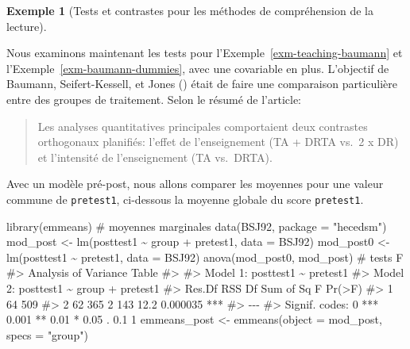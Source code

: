 \documentclass[
  11pt,
  letterpaper,
]{scrbook}
\newenvironment{Shaded}{\begin{snugshade}}{\end{snugshade}}
\newcommand{\AttributeTok}[1]{\textcolor[rgb]{0.40,0.45,0.13}{#1}}
\newcommand{\CommentTok}[1]{\textcolor[rgb]{0.37,0.37,0.37}{#1}}
\newcommand{\FunctionTok}[1]{\textcolor[rgb]{0.28,0.35,0.67}{#1}}
\newcommand{\NormalTok}[1]{\textcolor[rgb]{0.00,0.23,0.31}{#1}}
\newcommand{\OtherTok}[1]{\textcolor[rgb]{0.00,0.23,0.31}{#1}}
\newcommand{\SpecialCharTok}[1]{\textcolor[rgb]{0.37,0.37,0.37}{#1}}
\newcommand{\StringTok}[1]{\textcolor[rgb]{0.13,0.47,0.30}{#1}}
\theoremstyle{plain}
\theoremstyle{plain}
\theoremstyle{definition}
\newtheorem{example}{Exemple}[chapter]
\theoremstyle{definition}
\theoremstyle{remark}
\begin{document}
\begin{example}[Tests et contrastes pour les méthodes de compréhension
de la
lecture]\protect\hypertarget{exm-teachingtoread}{}\label{exm-teachingtoread}

Nous examinons maintenant les tests pour
l'Exemple~\ref{exm-teaching-baumann} et
l'Exemple~\ref{exm-baumann-dummies}, avec une covariable en plus.
L'objectif de Baumann, Seifert-Kessell, et Jones
() était de faire une comparaison
particulière entre des groupes de traitement. Selon le résumé de
l'article:

\begin{quote}
Les analyses quantitatives principales comportaient deux contrastes
orthogonaux planifiés: l'effet de l'enseignement (TA + DRTA vs.~2 x DR)
et l'intensité de l'enseignement (TA vs.~DRTA).
\end{quote}

Avec un modèle pré-post, nous allons comparer les moyennes pour une
valeur commune de \texttt{pretest1}, ci-dessous la moyenne globale du
score \texttt{pretest1}.

\begin{Shaded}
\begin{Highlighting}[]
\FunctionTok{library}\NormalTok{(emmeans) }\CommentTok{\# moyennes marginales}
\FunctionTok{data}\NormalTok{(BSJ92, }\AttributeTok{package =} \StringTok{"hecedsm"}\NormalTok{)}
\NormalTok{mod\_post }\OtherTok{\textless{}{-}} \FunctionTok{lm}\NormalTok{(posttest1 }\SpecialCharTok{\textasciitilde{}}\NormalTok{ group }\SpecialCharTok{+}\NormalTok{ pretest1,}
               \AttributeTok{data =}\NormalTok{ BSJ92)}
\NormalTok{mod\_post0 }\OtherTok{\textless{}{-}} \FunctionTok{lm}\NormalTok{(posttest1 }\SpecialCharTok{\textasciitilde{}}\NormalTok{ pretest1,}
               \AttributeTok{data =}\NormalTok{ BSJ92)}
\FunctionTok{anova}\NormalTok{(mod\_post0, mod\_post) }\CommentTok{\# tests F}
\CommentTok{\#\textgreater{} Analysis of Variance Table}
\CommentTok{\#\textgreater{} }
\CommentTok{\#\textgreater{} Model 1: posttest1 \textasciitilde{} pretest1}
\CommentTok{\#\textgreater{} Model 2: posttest1 \textasciitilde{} group + pretest1}
\CommentTok{\#\textgreater{}   Res.Df RSS Df Sum of Sq    F   Pr(\textgreater{}F)    }
\CommentTok{\#\textgreater{} 1     64 509                               }
\CommentTok{\#\textgreater{} 2     62 365  2       143 12.2 0.000035 ***}
\CommentTok{\#\textgreater{} {-}{-}{-}}
\CommentTok{\#\textgreater{} Signif. codes:  0 \textquotesingle{}***\textquotesingle{} 0.001 \textquotesingle{}**\textquotesingle{} 0.01 \textquotesingle{}*\textquotesingle{} 0.05 \textquotesingle{}.\textquotesingle{} 0.1 \textquotesingle{} \textquotesingle{} 1}
\NormalTok{emmeans\_post }\OtherTok{\textless{}{-}} \FunctionTok{emmeans}\NormalTok{(}\AttributeTok{object =}\NormalTok{ mod\_post,}
                        \AttributeTok{specs =} \StringTok{"group"}\NormalTok{)}
\end{Highlighting}
\end{Shaded}


\end{example}
\end{document}
